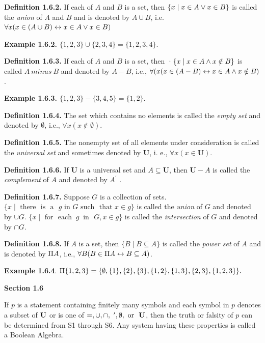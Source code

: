 \begin{large}
\textbf{Definition 1.6.2.} If each of $A$ and $B$ is a set, then $\{x \mid x \in A \lor  x \in B \}$ is called the \textit{union} of $A$ and $B$ and is denoted by $A \cup B$, i.e.   $\forall x (x \in (A \cup B) \leftrightarrow x \in A \lor x \in B)$ \nl

\textbf{Example 1.6.2.} $\{ 1, 2, 3\} \cup  \{2, 3, 4\} = \{ 1,2,3,4\}$.\nl

\textbf{Definition 1.6.3.} If each of $A$ and $B$ is a set, then ·$\{x \mid x \in A \wedge x \notin B\}$ is called $A~minus~B$ and denoted by $A - B$, i.e., $\forall (x(x \in (A-B) \leftrightarrow x \in A \wedge  x \notin B)$. \nl

\textbf{Example 1.6.3.} $\{1, 2, 3\}-\{3, 4, 5\} = \{1, 2\}$. \nl

\textbf{Definition 1.6.4.} The set which contains no elements is called the \textit{empty set} and denoted by $\emptyset$, i.e., $\forall x(x \notin \emptyset)$.\nl

\textbf{Definition 1.6.5.} The nonempty set of all elements under consideration is called the \textit{universal set} and sometimes denoted by \textbf{U}, i. e., $\forall x(x \in \textbf{U}).$ \nl

\textbf{Definition 1.6.6.} If \textbf{U} is a universal set and $A \subseteq \textbf{U}$, then $\textbf{U} - A$ is called the \textit{complement} of $A$ and denoted by $A^{'}$ . \nl

\textbf{Definition 1.6.7.} Suppose $G$ is a collection of sets. $\{x \mid \text{~there ~is ~a ~}g \text{~in~} G \text{~such ~that~} x \in g\}$ is called the \textit{union} of $G$ and denoted by $\cup G$. \nl
$\{x \mid \text {~for~ each~} ~g~ \text{~in~ }G, x \in g\}$ is called the \textit{intersection} of $G$ and denoted by
$\cap G$. \nl

\textbf{Definition 1.6.8.} If $A$ is a set, then $\{B \mid B \subseteq A\}$ is called the \textit{power set} of
$A$ and is denoted by $\Pi A$, i.e., $ \forall B(B \in \Pi A \leftrightarrow B \subseteq A)$. \nl

\textbf{Example 1.6.4}. $ \Pi \{ 1, 2, 3\} = \{ \emptyset, \{ 1 \}, \{2\}, \{3\}, \{ 1, 2\}, \{1, 3\} , \{ 2, 3\}, \{1, 2, 3\} \}.$ \nl

\newpage
\textbf{Section 1.6} \nl

If $p$ is a statement containing finitely many symbols and each symbol in $p$ denotes a subset of $\textbf{U}$ or is one of $=, \cup , \cap ,~ ', \emptyset , \text{~or~ } \textbf{U} $, then the truth or falsity of $p$ can be determined from S1 through S6. Any system having these properties is called a Boolean Algebra. \nl


\end{large}
